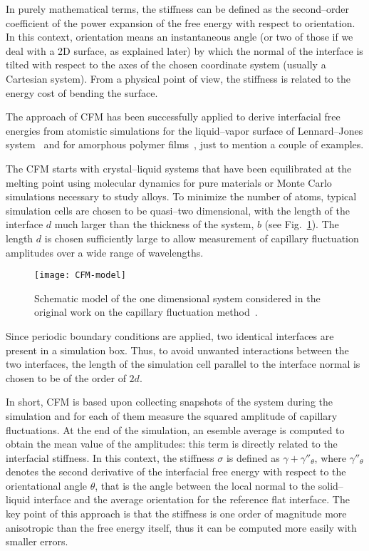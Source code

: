 In purely mathematical terms, the stiffness can be defined as the second--order coefficient of the power expansion of the free energy with respect to orientation. In this context, orientation means an instantaneous angle (or two of those if we deal with a 2D surface, as explained later) by which the normal of the interface is tilted with respect to the axes of the chosen coordinate system (usually a Cartesian system). From a physical point of view, the stiffness is related to the energy cost of bending the surface.

The approach of CFM has been successfully applied to derive interfacial free energies from atomistic simulations for the liquid--vapor surface of Lennard--Jones system~\cite{Sides1999:HoytREVIEW43} and for amorphous polymer films~\cite{Hapke1998:HoytREVIEW44}, just to mention a couple of examples.

The CFM starts with crystal–liquid systems that have been equilibrated at the melting point
using molecular dynamics for pure materials or Monte Carlo simulations necessary to study alloys. To minimize the number of atoms, typical simulation cells are chosen to be quasi--two dimensional, with the length of the interface $d$ much larger than the thickness of the system, $b$ (see Fig.~\ref{fig:CFM_model}). The length $d$ is chosen sufficiently large to allow measurement of capillary fluctuation amplitudes over a wide range of wavelengths.
\begin{figure}[bt]
    \centering
    \texttt{[image: CFM-model]}
    \caption{Schematic model of the one dimensional system considered in the original work on the capillary fluctuation method~\cite{Hoyt2003CFMReview}.}
    \label{fig:CFM_model}
\end{figure}

Since periodic boundary conditions are applied, two identical interfaces are present in a simulation box. Thus, to avoid unwanted interactions between the two interfaces, the length of the simulation cell parallel to the interface normal is chosen to be of the order of $2d$.

In short, CFM is based upon collecting snapshots of the system during the simulation and for each of them measure the squared amplitude of capillary fluctuations. At the end of the simulation, an esemble average is computed to obtain the mean value of the amplitudes: this term is directly related to the interfacial stiffness. In this context, the stiffness $\sigma$ is defined as $\gamma + \gamma''_{\theta}$, where $\gamma''_{\theta}$ denotes the second derivative of the interfacial free energy with respect to the orientational angle $\theta$, that is the angle between the local normal to the solid--liquid interface and the average orientation for the reference flat interface. The key point of this approach is that the stiffness is one order of magnitude more anisotropic than the free energy itself, thus it can be computed more easily with smaller errors.

